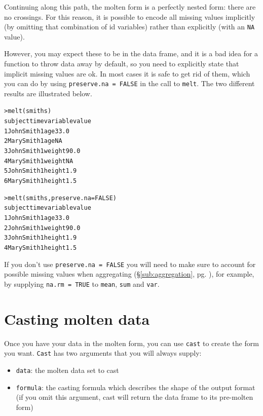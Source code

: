\documentclass[oneside,letterpaper]{scrartcl}
\newcommand{\secref}[1]{\S \ref{#1}, pg. \pageref{#1}}
\begin{document}
Continuing along this path, the molten form is a perfectly nested form: there are no crossings.  For this reason, it is possible to encode all missing values implicitly (by omitting that combination of id variables) rather than explicitly (with an {\tt NA} value).

However, you may expect these to be in the data frame, and it is a bad idea for a function to throw data away by default, so you need to explicitly state that implicit missing values are ok.  In most cases it is safe to get rid of them, which you can do by using {\tt preserve.na = FALSE} in the call to {\tt melt}.  The two different results are illustrated below.

\begin{alltt}
> melt(smiths)
     subject time variable value
1 John Smith    1      age  33.0
2 Mary Smith    1      age    NA
3 John Smith    1   weight  90.0
4 Mary Smith    1   weight    NA
5 John Smith    1   height   1.9
6 Mary Smith    1   height   1.5

> melt(smiths, preserve.na = FALSE)
     subject time variable value
1 John Smith    1      age  33.0
2 John Smith    1   weight  90.0
3 John Smith    1   height   1.9
4 Mary Smith    1   height   1.5

\end{alltt}
 
If you don't use {\tt preserve.na = FALSE} you will need to make sure to account for possible missing values when aggregating (\secref{sub:aggregation}), for example, by supplying {\tt na.rm = TRUE} to {\tt mean}, {\tt sum} and {\tt var}.

\newpage
\section{Casting molten data}\label{sub:casting}

Once you have your data in the molten form, you can use {\tt cast} to create the form you want.  {\tt Cast} has two arguments that you will always supply:

\begin{itemize}
	\item {\tt data}: the molten data set to cast
	\item {\tt formula}: the casting formula which describes the shape of the output format (if you omit this argument, cast will return the data frame to its pre-molten form)
\end{itemize} 
\end{document}
